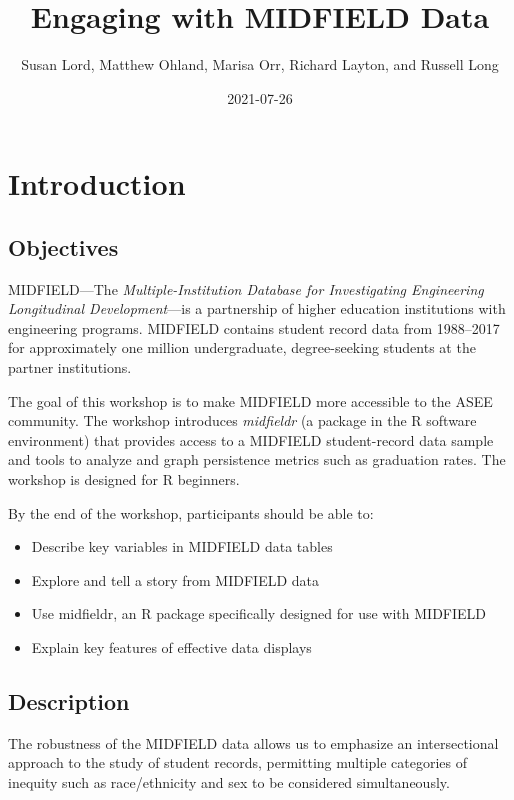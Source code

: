 \documentclass[
]{book}
\title{Engaging with MIDFIELD Data}
\author{Susan Lord, Matthew Ohland, Marisa Orr, Richard Layton, and Russell Long}
\date{2021-07-26}
\providecommand{\tightlist}{%
  \setlength{\itemsep}{0pt}\setlength{\parskip}{0pt}}
\begin{document}
\maketitle

{
\setcounter{tocdepth}{1}
\tableofcontents
}
\hypertarget{introduction}{%
\chapter{Introduction}\label{introduction}}

\hypertarget{objectives}{%
\section{Objectives}\label{objectives}}

MIDFIELD---The \emph{Multiple-Institution Database for Investigating Engineering Longitudinal Development}---is a partnership of higher education institutions with engineering programs. MIDFIELD contains student record data from 1988--2017 for approximately one million undergraduate, degree-seeking students at the partner institutions.

The goal of this workshop is to make MIDFIELD more accessible to the ASEE community. The workshop introduces \emph{midfieldr} (a package in the R software environment) that provides access to a MIDFIELD student-record data sample and tools to analyze and graph persistence metrics such as graduation rates. The workshop is designed for R beginners.

By the end of the workshop, participants should be able to:

\begin{itemize}
\tightlist
\item
  Describe key variables in MIDFIELD data tables
\item
  Explore and tell a story from MIDFIELD data
\item
  Use midfieldr, an R package specifically designed for use with MIDFIELD
\item
  Explain key features of effective data displays
\end{itemize}

\hypertarget{description}{%
\section{Description}\label{description}}

The robustness of the MIDFIELD data allows us to emphasize an intersectional approach to the study of student records, permitting multiple categories of inequity such as race/ethnicity and sex to be considered simultaneously.
\end{document}
